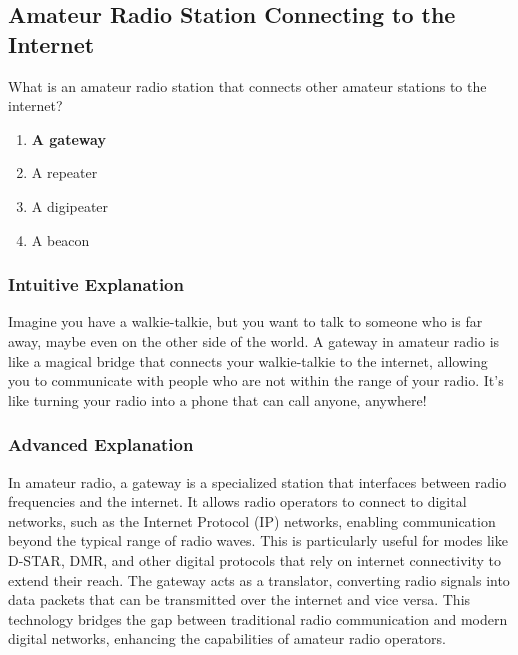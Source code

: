 \subsection{Amateur Radio Station Connecting to the Internet}
\label{T8C11}

\begin{tcolorbox}[colback=gray!10!white,colframe=black!75!black,title=T8C11]
What is an amateur radio station that connects other amateur stations to the internet?
\begin{enumerate}[noitemsep]
    \item \textbf{A gateway}
    \item A repeater
    \item A digipeater
    \item A beacon
\end{enumerate}
\end{tcolorbox}

\subsubsection*{Intuitive Explanation}
Imagine you have a walkie-talkie, but you want to talk to someone who is far away, maybe even on the other side of the world. A gateway in amateur radio is like a magical bridge that connects your walkie-talkie to the internet, allowing you to communicate with people who are not within the range of your radio. It’s like turning your radio into a phone that can call anyone, anywhere!

\subsubsection*{Advanced Explanation}
In amateur radio, a gateway is a specialized station that interfaces between radio frequencies and the internet. It allows radio operators to connect to digital networks, such as the Internet Protocol (IP) networks, enabling communication beyond the typical range of radio waves. This is particularly useful for modes like D-STAR, DMR, and other digital protocols that rely on internet connectivity to extend their reach. The gateway acts as a translator, converting radio signals into data packets that can be transmitted over the internet and vice versa. This technology bridges the gap between traditional radio communication and modern digital networks, enhancing the capabilities of amateur radio operators.